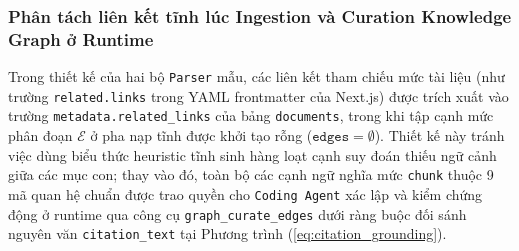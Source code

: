 \subsubsection{Phân tách liên kết tĩnh lúc Ingestion và Curation Knowledge Graph ở Runtime}
Trong thiết kế của hai bộ \texttt{Parser} mẫu, các liên kết tham chiếu mức tài liệu (như trường \texttt{related.\allowbreak links} trong YAML frontmatter của Next.js) được trích xuất vào trường \texttt{metadata.\allowbreak related\_\allowbreak links} của bảng \texttt{documents}, trong khi tập cạnh mức phân đoạn $\mathcal{E}$ ở pha nạp tĩnh được khởi tạo rỗng ($\texttt{edges} = \emptyset$). Thiết kế này tránh việc dùng biểu thức heuristic tĩnh sinh hàng loạt cạnh suy đoán thiếu ngữ cảnh giữa các mục con; thay vào đó, toàn bộ các cạnh ngữ nghĩa mức \texttt{chunk} thuộc 9 mã quan hệ chuẩn được trao quyền cho \texttt{Coding Agent} xác lập và kiểm chứng động ở runtime qua công cụ \texttt{graph\_\allowbreak curate\_\allowbreak edges} dưới ràng buộc đối sánh nguyên văn \texttt{citation\_\allowbreak text} tại Phương trình (\ref{eq:citation_grounding}).
